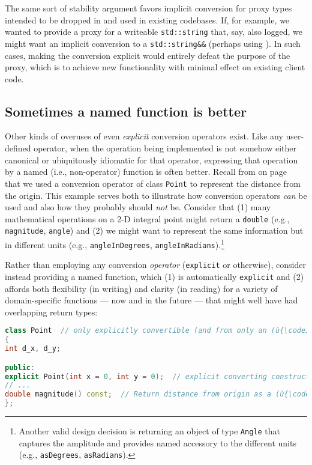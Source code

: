 The same sort of stability argument favors implicit conversion for proxy
types intended to be dropped in and used in existing codebases. If, for
example, we wanted to provide a proxy for a writeable
\texttt{std::string} that, say, also logged, we might want an implicit
conversion to a \texttt{std::string\&\&} (perhaps using
). In such cases, making the
conversion explicit would entirely defeat the purpose of the proxy,
which is to achieve new functionality with minimal effect on existing
client code.

\subsection[Sometimes a named function is better]{Sometimes a named function is better}\label{sometimes-a-named-function-is-better}

Other kinds of overuses of even \emph{explicit} conversion
operators exist. Like any user-defined operator, when the operation being
implemented is not somehow either canonical or ubiquitously idiomatic
for that operator, expressing that operation by a
named (i.e., non-operator) function is often better. Recall from
{\it{}} on page~\pageref{description-explicitconv} that we used a conversion operator of
class \texttt{Point} to represent the distance from the origin. This
example serves both to illustrate how conversion operators \emph{can} be
used and also how they probably should \emph{not} be. Consider that (1)
many mathematical operations on a 2-D integral point might return a \texttt{double} (e.g., \texttt{magnitude},
\texttt{angle}) and (2) we might want to represent the same
information but in different units (e.g., \texttt{angleInDegrees},
\texttt{angleInRadians}).{\cprotect\footnote{Another valid design
decision is returning an object of type \texttt{Angle} that captures
the amplitude and provides named accessory to the different units
(e.g., \texttt{asDegrees}, \texttt{asRadians}).}}

Rather than employing any conversion \emph{operator} (\texttt{explicit}
or otherwise), consider instead providing a named function, which (1) is
automatically \texttt{explicit} and (2) affords both flexibility (in
writing) and clarity (in reading) for a variety of domain-specific
functions --- now and in the future --- that might well have had
overlapping return types:

\begin{lstlisting}[language=C++]
class Point  // only explicitly convertible (and from only an (ù{\codeincomments{int}}ù))
{
int d_x, d_y;

public:
explicit Point(int x = 0, int y = 0);  // explicit converting constructor
// ...
double magnitude() const;  // Return distance from origin as a (ù{\codeincomments{double}}ù).
};
\end{lstlisting}

